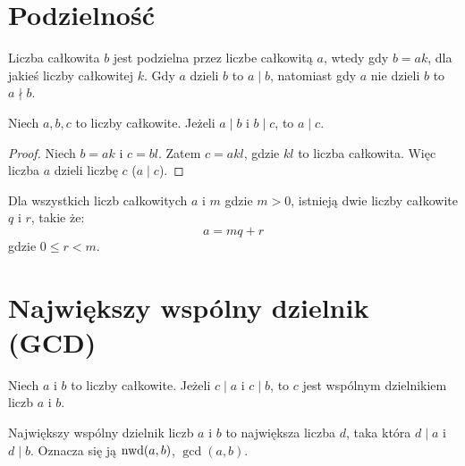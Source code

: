 
\section{Podzielność}

\iffalse
\begin{definition}
  ~ %
  \begin{itemize}
    \item Liczba całkowita $n$ jest parzysta jeżeli $n = 2k$ dla jakiegoś $k$
    \item Liczba całkowita $n$ jest nieparzysta jeżeli $n = 2k + 1$ dla jakiegoś $k$
  \end{itemize}
\end{definition}
\fi

\begin{definition}
  Liczba całkowita $b$ jest podzielna przez liczbe całkowitą $a$,
  wtedy gdy $b = ak$, dla jakieś liczby całkowitej $k$.
  Gdy $a$ dzieli $b$ to $a \mid b$,
  natomiast gdy $a$ nie dzieli $b$ to $a \nmid b$.
\end{definition}

\begin{theorem}
  Niech $a, b, c$ to liczby całkowite. Jeżeli $a \mid b$ i $b \mid c$, to $a \mid c$.
\end{theorem}

\begin{proof}
  Niech $b = ak$ i $c = bl$.
  Zatem $c = akl$, gdzie $kl$ to liczba całkowita.
  Więc liczba $a$ dzieli liczbę $c$ ($a \mid c$).
\end{proof}

\begin{theorem}
  Dla wszystkich liczb całkowitych $a$ i $m$ gdzie $m > 0$,
  istnieją dwie liczby całkowite $q$ i $r$, takie że:
  \[
    a = mq + r
  \]
  gdzie $0 \leq r < m$.
\end{theorem}

\section{Największy wspólny dzielnik (GCD)}

\begin{definition}[Podzielność]
  Niech $a$ i $b$ to liczby całkowite.
  Jeżeli $c \mid a$ i $c \mid b$,
  to $c$ jest wspólnym dzielnikiem liczb $a$ i $b$.

  Największy wspólny dzielnik
  liczb $a$ i $b$ to największa liczba $d$,
  taka która $d \mid a$ i $d \mid b$.
  Oznacza się ją $\operatorname{nwd}(a, b)$, $\gcd(a, b)$.
\end{definition}

